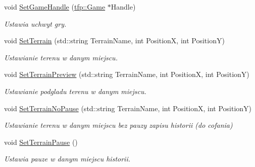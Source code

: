 \begin{DoxyCompactItemize}
\mbox{\label{classtfp_1_1_map_ad36ad3e4718214ea6eba8305a0fc3dff}} 
void \mbox{\hyperlink{classtfp_1_1_map_ad36ad3e4718214ea6eba8305a0fc3dff}{Set\+Game\+Handle}} (\mbox{\hyperlink{classtfp_1_1_game}{tfp\+::\+Game}} $\ast$Handle)
\begin{DoxyCompactList}\small\item\em Ustawia uchwyt gry. \end{DoxyCompactList}\item 
\mbox{\label{classtfp_1_1_map_afa31d2984466296de8b186370ff4522b}} 
void \mbox{\hyperlink{classtfp_1_1_map_afa31d2984466296de8b186370ff4522b}{Set\+Terrain}} (std\+::string Terrain\+Name, int PositionX, int PositionY)
\begin{DoxyCompactList}\small\item\em Ustawianie terenu w danym miejscu. \end{DoxyCompactList}\item 
\mbox{\label{classtfp_1_1_map_ac5b40a2462e28c61a7de8c2e6c41a4d6}} 
void \mbox{\hyperlink{classtfp_1_1_map_ac5b40a2462e28c61a7de8c2e6c41a4d6}{Set\+Terrain\+Preview}} (std\+::string Terrain\+Name, int PositionX, int PositionY)
\begin{DoxyCompactList}\small\item\em Ustawianie podgladu terenu w danym miejscu. \end{DoxyCompactList}\item 
\mbox{\label{classtfp_1_1_map_a8c6483b21e92d3ce135426c53ee79c72}} 
void \mbox{\hyperlink{classtfp_1_1_map_a8c6483b21e92d3ce135426c53ee79c72}{Set\+Terrain\+No\+Pause}} (std\+::string Terrain\+Name, int PositionX, int PositionY)
\begin{DoxyCompactList}\small\item\em Ustawianie terenu w danym miejscu bez pauzy zapisu historii (do cofania) \end{DoxyCompactList}\item 
\mbox{\label{classtfp_1_1_map_a03a9549a5e0aaa1a53244e98ed200b2e}} 
void \mbox{\hyperlink{classtfp_1_1_map_a03a9549a5e0aaa1a53244e98ed200b2e}{Set\+Terrain\+Pause}} ()
\begin{DoxyCompactList}\small\item\em Ustawia pauze w danym miejscu historii. \end{DoxyCompactList}\item 

\end{DoxyCompactItemize}

